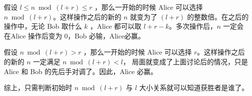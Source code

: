 \begin{frame}
假设 $l \leq n \bmod (l + r) \leq r$ ，那么一开始的时候 Alice 可以选择 $n \bmod (l + r)$。这样操作之后的新的 $n$ 就变为了 $(l + r)$ 的整数倍。在之后的操作中，无论 Bob 取什么 $k$ ，Alice 都可以取 $l + r - k$。多次操作后，$n$ 一定会在Alice 操作后变为 $0$，Bob 必输，Alice必赢。

假设 $n \bmod (l + r) > r$ ，那么一开始的时候 Alice 可以选择 $r$。这样操作之后的新的 $n$ 一定满足 $n \bmod (l + r) < l$， 局面就变成了上面讨论后的情况，只是 Alice 和 Bob 的先后手对调了。因此，Alice 必赢。

综上，只需判断初始时 $n \bmod (l + r)$ 与 $l$ 大小关系就可以知道获胜者是谁了。
\end{frame}

